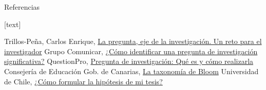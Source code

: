 \documentclass[
	11pt, %
]{beamer}
\begin{document}
\begin{frame}{Referencias}
  \begin{thebibliography}{10}
    [text]

    Trillos-Peña, Carlos Enrique, \href{http://www.scielo.org.co/scielo.php?script=sci_arttext&pid=S1692-72732017000300309}{La pregunta, eje de la investigación. Un reto para el investigador}
    Grupo Comunicar, \href{https://www.grupocomunicar.com/wp/escuela-de-autores/como-identificar-una-pregunta-de-investigacion-significativa/}{¿Cómo identificar una pregunta de investigación significativa?}
    QuestionPro, \href{https://www.questionpro.com/blog/es/pregunta-de-investigacion/}{Pregunta de investigación: Qué es y cómo realizarla}
    Consejería de Educación Gob. de Canarias, \href{https://www3.gobiernodecanarias.org/medusa/edublog/cprofestenerifesur/2015/12/03/la-taxonomia-de-bloom-una-herramienta-imprescindible-para-ensenar-y-aprender/}{La taxonomía de Bloom}
    Universidad de Chile, \href{https://aprendizaje.uchile.cl/recursos-para-leer-escribir-y-hablar-en-la-universidad/profundiza/profundiza-en-la-tesis/hipotesis/}{¿Cómo formular la hipótesis de mi tesis?}
  
  \end{thebibliography}
\end{frame}
\end{document}
